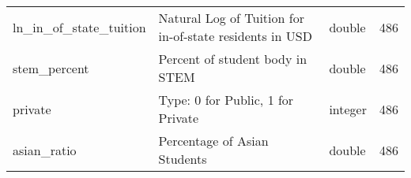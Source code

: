 \documentclass[
]{article}
\begin{document}
\begin{longtable}[]{@{}llll@{}}
\begin{minipage}[t]{0.19\columnwidth}
ln\_in\_of\_state\_tuition\strut
\end{minipage} & \begin{minipage}[t]{0.28\columnwidth}\raggedright
Natural Log of Tuition for in-of-state residents in USD\strut
\end{minipage} & \begin{minipage}[t]{0.18\columnwidth}\raggedright
double\strut
\end{minipage} & \begin{minipage}[t]{0.23\columnwidth}\raggedright
486\strut
\end{minipage}\tabularnewline
\begin{minipage}[t]{0.19\columnwidth}\raggedright
stem\_percent\strut
\end{minipage} & \begin{minipage}[t]{0.28\columnwidth}\raggedright
Percent of student body in STEM\strut
\end{minipage} & \begin{minipage}[t]{0.18\columnwidth}\raggedright
double\strut
\end{minipage} & \begin{minipage}[t]{0.23\columnwidth}\raggedright
486\strut
\end{minipage}\tabularnewline
\begin{minipage}[t]{0.19\columnwidth}\raggedright
private\strut
\end{minipage} & \begin{minipage}[t]{0.28\columnwidth}\raggedright
Type: 0 for Public, 1 for Private\strut
\end{minipage} & \begin{minipage}[t]{0.18\columnwidth}\raggedright
integer\strut
\end{minipage} & \begin{minipage}[t]{0.23\columnwidth}\raggedright
486\strut
\end{minipage}\tabularnewline
\begin{minipage}[t]{0.19\columnwidth}\raggedright
asian\_ratio\strut
\end{minipage} & \begin{minipage}[t]{0.28\columnwidth}\raggedright
Percentage of Asian Students\strut
\end{minipage} & \begin{minipage}[t]{0.18\columnwidth}\raggedright
double\strut
\end{minipage} & \begin{minipage}[t]{0.23\columnwidth}\raggedright
486\strut
\end{minipage}\tabularnewline

\end{longtable}
\end{document}
